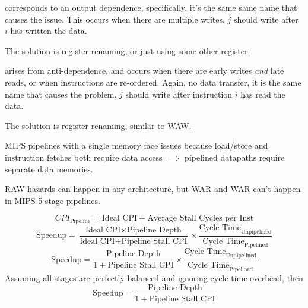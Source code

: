 \documentclass[12pt]{scrartcl}
\begin{document}
\begin{definition}
   corresponds to an output dependence, specifically, it's the same same name that causes the issue. This occurs when there are 
  multiple writes. $j$ should write after $i$ has written the data. 
  
  The solution is register renaming, or just using some other register. 
\end{definition}

\begin{definition}
   arises from anti-dependence, and occurs when there are early writes \textit{and} late reads, or when 
  instructions are re-ordered. Again, no data transfer, it is the same name that causes the problem. $j$ should write after instruction $i$ has read the data. 

  The solution is register renaming, similar to WAW. 
\end{definition}

\begin{note}
  MIPS pipelines with a single memory face issues because load/store and instruction fetches both require data access $\implies$ 
  pipelined datapaths require separate data memories. 
\end{note}

\begin{note}
  RAW hazards can happen in any architecture, but WAR and WAR can't happen in MIPS 5 stage pipelines. 
\end{note}

\begin{theorem}
  \[CPI_{\text{Pipeline}} = \text{Ideal CPI} + \text{Average Stall Cycles per Inst}\]
  \[\text{Speedup} = \dfrac{\text{Ideal CPI} \times \text{Pipeline Depth}}{\text{Ideal CPI} + \text{Pipeline Stall CPI}} \times \dfrac{\text{Cycle Time}_{\text{Unpipelined}}}{\text{Cycle Time}_{\text{Pipelined}}}\]
  \[\text{Speedup} = \dfrac{\text{Pipeline Depth}}{1+ \text{Pipeline Stall CPI}} \times \dfrac{\text{Cycle Time}_{\text{Unpipelined}}}{\text{Cycle Time}_{\text{Pipelined}}}\]
  Assuming all stages are perfectly balanced and ignoring cycle time overhead, then
  \[\text{Speedup} = \dfrac{\text{Pipeline Depth}}{1+ \text{Pipeline Stall CPI}}\] 
\end{theorem}
\end{document}
